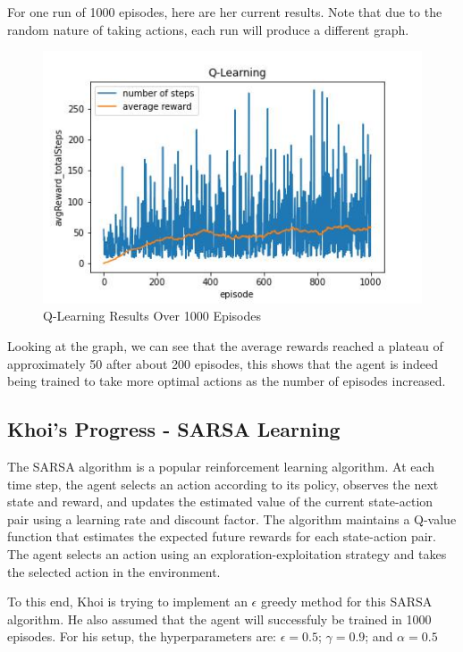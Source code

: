\documentclass[nohyperref]{article}
\theoremstyle{plain}
\theoremstyle{definition}
\theoremstyle{remark}
\begin{document}
For one run of 1000 episodes, here are her current results. Note that due to the random nature of taking actions, each run will produce a different graph.

\begin{figure}[H] %
    \centering
    \includegraphics[width=1\linewidth]{q-learning-average-1k.png}
    \caption{Q-Learning Results Over 1000 Episodes}
\end{figure}

Looking at the graph, we can see that the average rewards reached a plateau of approximately 50 after about 200 episodes, this shows that the agent is indeed being trained to
take more optimal actions as the number of episodes increased.

\subsection{Khoi's Progress - SARSA Learning}
The SARSA algorithm is a popular reinforcement learning algorithm. At each time step, the agent selects an action according to its policy, observes the next state and reward, and updates the estimated value of the current state-action pair using a learning rate and discount factor. 
The algorithm maintains a Q-value function that estimates the expected future rewards for each state-action pair. The agent selects an action using an exploration-exploitation strategy and takes the selected action in the environment.

To this end, Khoi is trying to implement an $\epsilon$ greedy method for this SARSA algorithm. He also assumed that the agent will successfuly be trained in 1000 episodes. For his setup, the hyperparameters are: $\epsilon = 0.5$; $\gamma = 0.9$; and $\alpha = 0.5$
\end{document}
